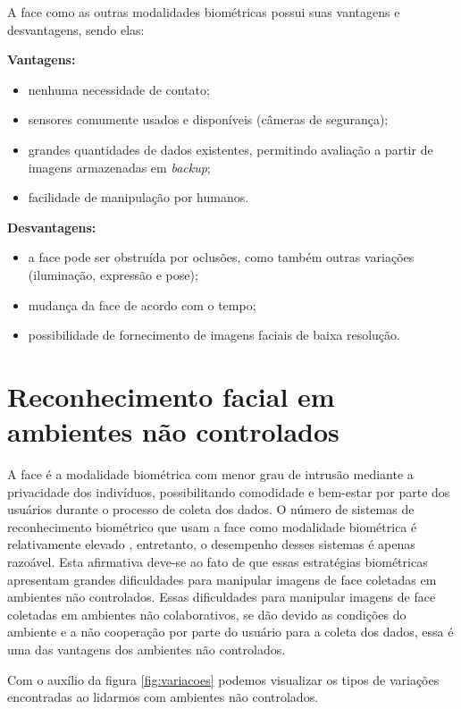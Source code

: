 A face como as outras modalidades biométricas possui suas vantagens e desvantagens, sendo elas:

\noindent \textbf{Vantagens:}
\begin{itemize}
\item nenhuma necessidade de contato;
\item sensores comumente usados e disponíveis (câmeras de segurança);
\item grandes quantidades de dados existentes, permitindo avaliação a partir de imagens armazenadas em \textit{backup};
\item facilidade de manipulação por humanos.
\end{itemize}


\noindent \textbf{Desvantagens:}
\begin{itemize}
\item a face pode ser obstruída por oclusões, como também outras variações (iluminação, expressão e pose);
\item mudança da face de acordo com o tempo;
\item possibilidade de fornecimento de imagens faciais de baixa resolução.
\end{itemize}


\section{Reconhecimento facial em ambientes não controlados}
A face é a modalidade biométrica  com menor grau de intrusão mediante a privacidade dos indivíduos, possibilitando comodidade e bem-estar por parte dos usuários durante o processo de coleta dos dados.  O número de sistemas de reconhecimento biométrico que usam a face como modalidade biométrica é relativamente elevado \cite{buciu2014challenges}, entretanto, o desempenho desses sistemas é apenas razoável. Esta afirmativa deve-se ao fato de que essas estratégias biométricas apresentam grandes dificuldades para manipular imagens de face coletadas em ambientes não controlados. Essas dificuldades para manipular imagens de face coletadas em ambientes não colaborativos, se dão devido as condições do ambiente e a não cooperação por parte do usuário para a coleta dos dados, essa é uma das vantagens dos ambientes não controlados.

Com o auxílio da figura \ref{fig:variacoes} podemos visualizar os tipos de variações encontradas ao lidarmos com ambientes não controlados.
 
